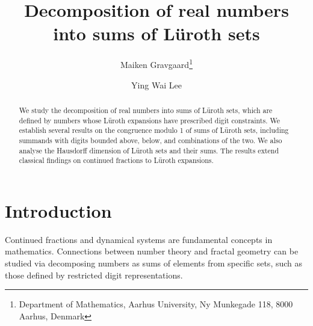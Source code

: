 \documentclass{ws-ijnt}
\begin{document}
	
	
	\catchline{}{}{}{}{}
	
	\title{Decomposition of real numbers into sums of {L\"uroth} sets}
	
	
	\author{Maiken Gravgaard\footnote{
			Department of Mathematics, Aarhus University, Ny Munkegade 118,
			8000 Aarhus, Denmark}}
	
	\address{Department of Mathematics, Aarhus University, Ny Munkegade 118\\
		Aarhus, 8000,Denmark\,\\
		 }
	
	\author{Ying Wai Lee}
	
	\address{Department of Mathematics, University of York\\
		York, YO10 5DD, United Kingdom\\
		yingwai.lee@york.au.dk }
	
	\maketitle
	
	\begin{history}
	\end{history}
	
	\begin{abstract}
		We study the decomposition of real numbers into sums of L\"uroth sets, which are defined by numbers whose L\"uroth expansions have prescribed digit constraints. We establish several results on the congruence modulo 1 of sums of L\"uroth sets, including summands with digits bounded above, below, and combinations of the two. We also analyse the Hausdorff dimension of L\"uroth sets and their sums. The results extend classical findings on continued fractions to L\"uroth expansions.
	\end{abstract}
	
	
	
	\section{Introduction}\label{sectintro}
	Continued fractions and dynamical systems are fundamental concepts in mathematics. Connections between number theory and fractal geometry can be studied via decomposing numbers as sums of elements from specific sets, such as those defined by restricted digit representations.
	
\end{document}
